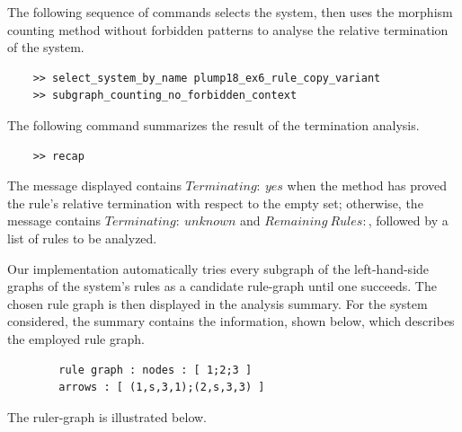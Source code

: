 The following sequence of commands selects the system, then uses the morphism counting method without forbidden patterns to analyse the relative termination of the system.
\begin{lstlisting}
    >> select_system_by_name plump18_ex6_rule_copy_variant
    >> subgraph_counting_no_forbidden_context
\end{lstlisting}
The following command summarizes the result of the termination analysis.
 \begin{lstlisting}
    >> recap
\end{lstlisting}

The message displayed contains \colorbox{Ivory2}{$Terminating:\ yes$} when the method has proved the rule's relative termination with respect to the empty set; otherwise, the message contains \colorbox{Ivory2}{$Terminating:\ unknown$} and \colorbox{Ivory2}{$Remaining\ Rules:$}, followed by a list of rules to be analyzed.

Our implementation automatically tries every subgraph of the left-hand-side graphs of the system's rules as a candidate rule-graph until one succeeds. The chosen rule graph is then displayed in the analysis summary. For the system considered, the summary contains the information, shown below, which describes the employed rule graph.
\begin{center}
    \begin{lstlisting}
        rule graph : nodes : [ 1;2;3 ]
        arrows : [ (1,s,3,1);(2,s,3,3) ]
    \end{lstlisting}
\end{center}
The ruler-graph is illustrated below.
\begin{center}
    \end{center}

